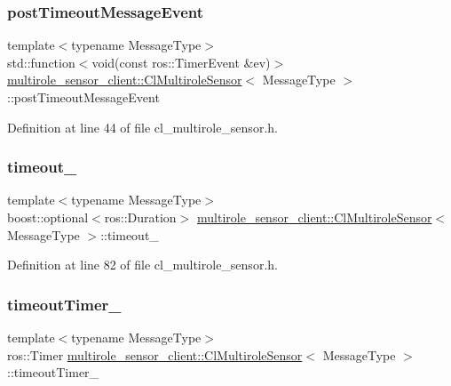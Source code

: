\subsubsection{\texorpdfstring{post\+Timeout\+Message\+Event}{postTimeoutMessageEvent}}
{\footnotesize\ttfamily template$<$typename Message\+Type$>$ \\
std\+::function$<$void(const ros\+::\+Timer\+Event \&ev)$>$ \hyperlink{classmultirole__sensor__client_1_1ClMultiroleSensor}{multirole\+\_\+sensor\+\_\+client\+::\+Cl\+Multirole\+Sensor}$<$ Message\+Type $>$\+::post\+Timeout\+Message\+Event}



Definition at line 44 of file cl\+\_\+multirole\+\_\+sensor.\+h.

\mbox{\label{classmultirole__sensor__client_1_1ClMultiroleSensor_ad3f88235bff8714c6abe97dec3c276ea}} 
\subsubsection{\texorpdfstring{timeout\+\_\+}{timeout\_}}
{\footnotesize\ttfamily template$<$typename Message\+Type$>$ \\
boost\+::optional$<$ros\+::\+Duration$>$ \hyperlink{classmultirole__sensor__client_1_1ClMultiroleSensor}{multirole\+\_\+sensor\+\_\+client\+::\+Cl\+Multirole\+Sensor}$<$ Message\+Type $>$\+::timeout\+\_\+}



Definition at line 82 of file cl\+\_\+multirole\+\_\+sensor.\+h.

\mbox{\label{classmultirole__sensor__client_1_1ClMultiroleSensor_a1ac5801d1a126ebc3bd774bb001524fa}} 
\subsubsection{\texorpdfstring{timeout\+Timer\+\_\+}{timeoutTimer\_}}
{\footnotesize\ttfamily template$<$typename Message\+Type$>$ \\
ros\+::\+Timer \hyperlink{classmultirole__sensor__client_1_1ClMultiroleSensor}{multirole\+\_\+sensor\+\_\+client\+::\+Cl\+Multirole\+Sensor}$<$ Message\+Type $>$\+::timeout\+Timer\+\_\+\hspace{0.3cm}{\ttfamily [private]}}



